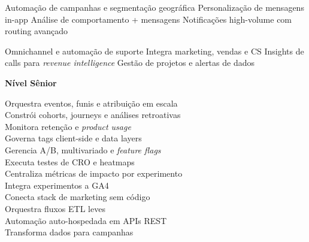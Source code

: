  Automação de campanhas e segmentação geográfica
 Personalização de mensagens in-app
 Análise de comportamento + mensagens
 Notificações high-volume com routing avançado

 Omnichannel e automação de suporte
 Integra marketing, vendas e CS
 Insights de calls para \textit{revenue intelligence}
 Gestão de projetos e alertas de dados

\textbf{Nível Sênior}

 Orquestra eventos, funis e atribuição em escala\\
 Constrói cohorts, journeys e análises retroativas\\
 Monitora retenção e \textit{product usage}\\
 Governa tags client-side e data layers\\
[0.5em]

 Gerencia A/B, multivariado e \textit{feature flags}\\
 Executa testes de CRO e heatmaps\\
 Centraliza métricas de impacto por experimento\\
 Integra experimentos a GA4\\
[0.5em]

 Conecta stack de marketing sem código\\
 Orquestra fluxos ETL leves\\
 Automação auto-hospedada em APIs REST\\
 Transforma dados para campanhas\\
[0.5em]

